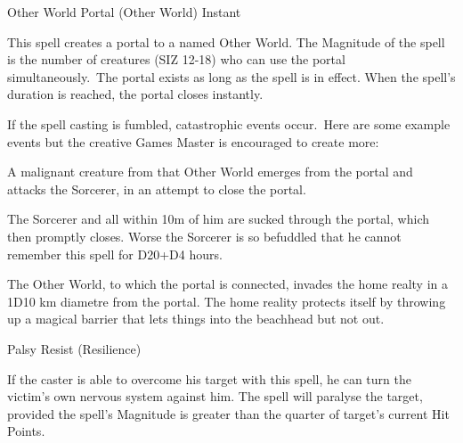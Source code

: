\begin{samepage}
\begin{rpg-spell}
{Other World Portal (Other World)}
{Instant}

This spell creates a portal to a named Other World. The Magnitude of the spell is the number of creatures (SIZ 12-18) who can use the portal simultaneously. The portal exists as long as the spell is in effect. When the spell’s duration is reached, the portal closes instantly. 

If the spell casting is fumbled, catastrophic events occur. Here are some example events but the creative Games Master is encouraged to create more:
\begin{rpg-list}
\item A malignant creature from that Other World emerges from the portal and attacks the Sorcerer, in an attempt to close the portal. 
\item The Sorcerer and all within 10m of him are sucked through the portal, which then promptly closes. Worse the Sorcerer is so befuddled that he cannot remember this spell for D20+D4 hours.
\item The Other World, to which the portal is connected, invades the home realty in a 1D10 km diametre from the portal. The home reality protects itself by throwing up a magical barrier that lets things into the beachhead but not out. 
\end{rpg-list}
\end{rpg-spell}
\end{samepage}


\begin{samepage}
\begin{rpg-spell}
{Palsy}
{Resist (Resilience)}

If the caster is able to overcome his target with this spell, he can turn the victim’s own nervous system against him. The spell will paralyse the target, provided the spell’s Magnitude is greater than the quarter of target’s current Hit Points. 
\end{rpg-spell}
\end{samepage}


